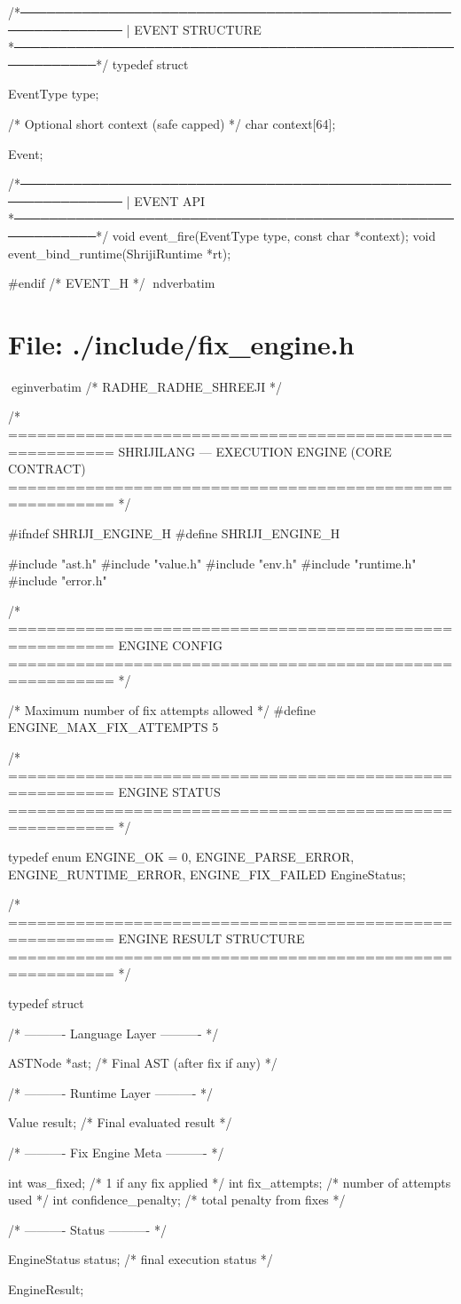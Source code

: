 \documentclass{article}
\begin{document}
/*──────────────────────────────────────────────────────────────
 |  EVENT STRUCTURE
 *────────────────────────────────────────────────────────────*/
typedef struct {

    EventType type;

    /* Optional short context (safe capped) */
    char context[64];

} Event;


/*──────────────────────────────────────────────────────────────
 |  EVENT API
 *────────────────────────────────────────────────────────────*/
void event_fire(EventType type, const char *context);
void event_bind_runtime(ShrijiRuntime *rt);

#endif /* EVENT_H */
nd{verbatim}
\section*{File: ./include/fix_engine.h}
egin{verbatim}
/* RADHE_RADHE_SHREEJI */

/* =========================================================
   SHRIJILANG — EXECUTION ENGINE (CORE CONTRACT)
   ========================================================= */

#ifndef SHRIJI_ENGINE_H
#define SHRIJI_ENGINE_H

#include "ast.h"
#include "value.h"
#include "env.h"
#include "runtime.h"
#include "error.h"

/* =========================================================
   ENGINE CONFIG
   ========================================================= */

/* Maximum number of fix attempts allowed */
#define ENGINE_MAX_FIX_ATTEMPTS 5

/* =========================================================
   ENGINE STATUS
   ========================================================= */

typedef enum
{
    ENGINE_OK = 0,
    ENGINE_PARSE_ERROR,
    ENGINE_RUNTIME_ERROR,
    ENGINE_FIX_FAILED
} EngineStatus;

/* =========================================================
   ENGINE RESULT STRUCTURE
   ========================================================= */

typedef struct
{
    /* ---------- Language Layer ---------- */

    ASTNode *ast;              /* Final AST (after fix if any) */

    /* ---------- Runtime Layer ---------- */

    Value result;              /* Final evaluated result */

    /* ---------- Fix Engine Meta ---------- */

    int was_fixed;             /* 1 if any fix applied */
    int fix_attempts;          /* number of attempts used */
    int confidence_penalty;    /* total penalty from fixes */

    /* ---------- Status ---------- */

    EngineStatus status;       /* final execution status */

} EngineResult;
\end{document}

